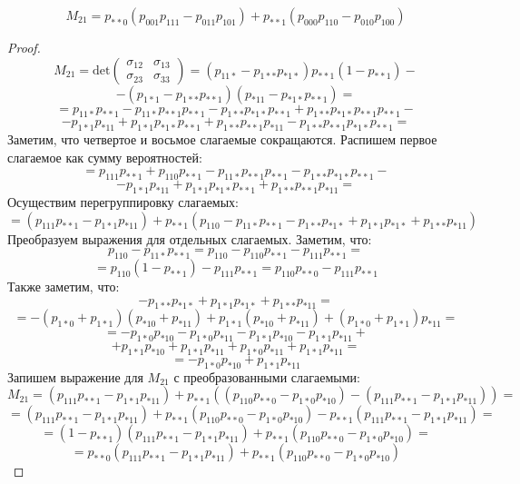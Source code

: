 \begin{lemma}\label{partial_cov}
    $$M_{21} = p_{**0}(p_{001}p_{111}-p_{011}p_{101}) + p_{**1} (p_{000}p_{110}-p_{010}p_{100})$$
\end{lemma}
\begin{proof}
    $$ M_{21}= \text{det}
        \begin{pmatrix}
            \sigma_{12} & \sigma_{13} \\
            \sigma_{23} & \sigma_{33}
        \end{pmatrix}
        = (p_{11*}-p_{1**}p_{*1*}) p_{**1}(1-p_{**1})-
    $$
    $$
        -(p_{1*1}-p_{1**}p_{**1})(p_{*11}-p_{*1*}p_{**1})=
    $$
    $$
        =p_{11*}p_{**1} - p_{11*}p_{**1}p_{**1} - p_{1**}p_{*1*}p_{**1} + p_{1**}p_{*1*}p_{**1}p_{**1}-
    $$
    $$
        -p_{1*1}p_{*11}+p_{1*1}p_{*1*}p_{**1}+p_{1**}p_{**1}p_{*11}-p_{1**}p_{**1}p_{*1*}p_{**1}=
    $$
    Заметим, что четвертое и восьмое слагаемые сокращаются. Распишем первое слагаемое как сумму вероятностей:
    $$
        =p_{111}p_{**1}+p_{110}p_{**1} - p_{11*}p_{**1}p_{**1} - p_{1**}p_{*1*}p_{**1} -
    $$
    $$
        -p_{1*1}p_{*11}+p_{1*1}p_{*1*}p_{**1}+p_{1**}p_{**1}p_{*11}=
    $$
    Осуществим перегруппировку слагаемых:
    $$
        =(p_{111}p_{**1}-p_{1*1}p_{*11})+p_{**1}(p_{110}-p_{11*}p_{**1} - p_{1**}p_{*1*} + p_{1*1}p_{*1*} + p_{1**}p_{*11})
    $$
    Преобразуем выражения для отдельных слагаемых.
    Заметим, что:
    $$
        p_{110}-p_{11*}p_{**1}=p_{110}-p_{110}p_{**1}-p_{111}p_{**1}=
    $$
    $$
        =p_{110}(1-p_{**1})-p_{111}p_{**1}=p_{110}p_{**0}-p_{111}p_{**1}
    $$
    Также заметим, что:
    $$
        -p_{1**}p_{*1*} + p_{1*1}p_{*1*} + p_{1**}p_{*11}=
    $$
    $$
        =-(p_{1*0}+p_{1*1})(p_{*10}+p_{*11})+p_{1*1}(p_{*10}+p_{*11}) + (p_{1*0}+p_{1*1})p_{*11}=
    $$
    $$
        =-p_{1*0}p_{*10}-p_{1*0}p_{*11}-p_{1*1}p_{*10}-p_{1*1}p_{*11}+
    $$
    $$
        +p_{1*1}p_{*10}+p_{1*1}p_{*11}+p_{1*0}p_{*11}+p_{1*1}p_{*11}=
    $$
    $$
        =-p_{1*0}p_{*10}+p_{1*1}p_{*11}
    $$
    Запишем выражение для $M_{21}$ с преобразованными слагаемыми:
    $$
        M_{21}=(p_{111}p_{**1}-p_{1*1}p_{*11})+p_{**1}((p_{110}p_{**0}-p_{1*0}p_{*10})-(p_{111}p_{**1}-p_{1*1}p_{*11}))=
    $$
    $$
        =(p_{111}p_{**1}-p_{1*1}p_{*11})+p_{**1}(p_{110}p_{**0}-p_{1*0}p_{*10})-p_{**1}(p_{111}p_{**1}-p_{1*1}p_{*11})=
    $$
    $$
        =(1-p_{**1})(p_{111}p_{**1}-p_{1*1}p_{*11})+p_{**1}(p_{110}p_{**0}-p_{1*0}p_{*10})=
    $$
    $$
        =p_{**0}(p_{111}p_{**1}-p_{1*1}p_{*11})+p_{**1}(p_{110}p_{**0}-p_{1*0}p_{*10})
    $$

\end{proof}
